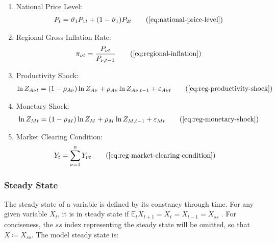 \documentclass[
thesis.tex
]{subfiles}
\begin{document}
{\begin{itemize}
\begin{enumerate}
		\item National Price Level:
		\begin{align}
			P_t = \vartheta_1 P_{1 t} + (1 -\vartheta_1) P_{2 t} \tag{\ref{eq:national-price-level}}
		\end{align}
			
		\item Regional Gross Inflation Rate:
		\begin{align}
			\pi_{\nu t} = \frac{P_{\nu t}}{P_{\nu, t-1}} \tag{\ref{eq:regional-inflation}}
		\end{align}
			
		\item Productivity Shock:
		\begin{align}
			\ln{Z_{A\nu t}} = (1-\rho_{A\nu})\ln{Z_{A\nu}} + \rho_{A\nu}\ln{Z_{A\nu,t-1}} + \varepsilon_{A\nu t} \tag{\ref{eq:reg-productivity-shock}}
		\end{align}
			
		\item Monetary Shock:
		\begin{align}
			\ln{Z_{Mt}} = (1-\rho_M)\ln{Z_{M}} + \rho_M\ln{Z_{M,t-1}} + \varepsilon_{Mt} \tag{\ref{eq:reg-monetary-shock}}
		\end{align}

		\item Market Clearing Condition:
		\begin{align}
			Y_t &= \sum_{\nu=1}^{n} Y_{\nu t} \tag{\ref{eq:reg-market-clearing-condition}}
		\end{align}
			
		\end{enumerate}
		
	\end{itemize}
	
} %



\subsubsection{Steady State}

The steady state of a variable is defined by its constancy through time. For any given variable $X_t$, it is in steady state if $\mathbb{E}_t X_{t+1} = X_t = X_{t-1} = X_{ss}$ \cite[p.41]{costa_junior_understanding_2016}. For conciseness, the $ss$ index representing the steady state will be omitted, so that $X \coloneq X_{ss}$. The model steady state is:
\end{document}
